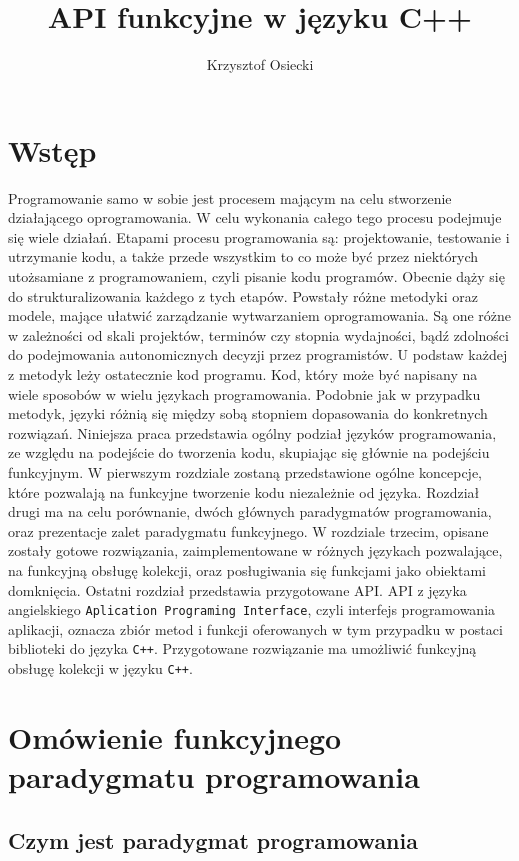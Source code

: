 \documentclass[a4paper,10pt]{report}
\title{API funkcyjne w języku C++}
\author{Krzysztof Osiecki}
\begin{document}
\pagestyle{fancy}\lhead{}\rightmark

\maketitle
\tableofcontents{}
\chapter*{Wstęp}
Programowanie samo w sobie jest procesem mającym na celu stworzenie działającego oprogramowania. W celu wykonania całego tego procesu podejmuje się wiele działań. Etapami procesu programowania są: projektowanie, testowanie i utrzymanie kodu, a także przede wszystkim to co może być przez niektórych utożsamiane z programowaniem, czyli pisanie kodu programów. Obecnie dąży się do strukturalizowania każdego z tych etapów. Powstały różne metodyki oraz modele, mające ułatwić zarządzanie wytwarzaniem oprogramowania. Są one różne w zależności od skali projektów, terminów czy stopnia wydajności, bądź zdolności do podejmowania autonomicznych decyzji przez programistów. U podstaw każdej z metodyk leży ostatecznie kod programu. Kod, który może być napisany na wiele sposobów w wielu językach programowania. Podobnie jak w przypadku metodyk, języki różnią się między sobą stopniem dopasowania do konkretnych rozwiązań. Niniejsza praca przedstawia ogólny podział języków programowania, ze względu na podejście do tworzenia kodu, skupiając się głównie na podejściu funkcyjnym. W pierwszym rozdziale zostaną przedstawione ogólne koncepcje, które pozwalają na funkcyjne tworzenie kodu niezależnie od języka. Rozdział drugi ma na celu porównanie, dwóch głównych paradygmatów programowania, oraz prezentacje zalet paradygmatu funkcyjnego. W rozdziale trzecim, opisane zostały gotowe rozwiązania, zaimplementowane w różnych językach pozwalające, na funkcyjną obsługę kolekcji, oraz posługiwania się funkcjami jako obiektami domknięcia. Ostatni rozdział przedstawia przygotowane API. API z języka angielskiego \verb|Aplication Programing Interface|, czyli interfejs programowania aplikacji, oznacza zbiór metod i funkcji oferowanych w tym przypadku w postaci biblioteki do języka \verb|C++|. Przygotowane rozwiązanie ma umożliwić funkcyjną obsługę kolekcji w języku \verb|C++|. 
\chapter{Omówienie funkcyjnego paradygmatu programowania}
\section{Czym jest paradygmat programowania}
\end{document}
